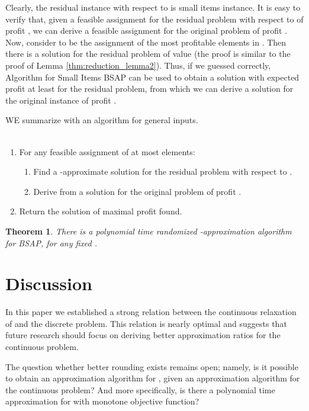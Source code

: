\documentclass[11pt]{article}
\newtheorem{theorem}{Theorem}[section]
\begin{document}
{Clearly, the residual instance with respect to  is
small items instance. It is easy to verify that,
 given a feasible assignment for the residual
problem with respect to  of profit , we can derive a feasible assignment for the original problem of profit . Now, consider
 to be the assignment of the  most profitable elements in . Then there is a solution for the residual problem of
value  (the proof is similar to the proof of Lemma
 \ref{thm:reduction_lemma2}). Thus, if we guessed  correctly,
Algorithm for Small Items BSAP can be used to obtain a solution with expected  profit at least  for the residual
problem, from which we can derive a solution for the original instance
of profit .

WE summarize with an algorithm for general inputs.
\\
\\
\begin{enumerate}
\item For any feasible assignment  of at most  elements:
\begin{enumerate}
\item Find a -approximate solution  for
the residual problem with respect to .
\item Derive from  a solution for the original problem
of profit .
\end{enumerate}
\item
Return  the solution of maximal profit found.
\end{enumerate}

\begin{theorem}
\label{thm:alg_bgap}
There is a polynomial time randomized -approximation algorithm for BSAP,
for any fixed .
\end{theorem}
}
\section{Discussion}

In this paper we established a strong relation between the
continuous relaxation of  and the discrete problem. This
relation is nearly optimal and suggests that future research
should focus on deriving better approximation ratios for the
continuous problem.

The question whether better rounding exists remains open; namely, is it
 possible to obtain an approximation algorithm for , given
an  approximation algorithm for the continuous problem?
And more specifically, is there a polynomial time approximation
for  with monotone objective function?
\end{document}
